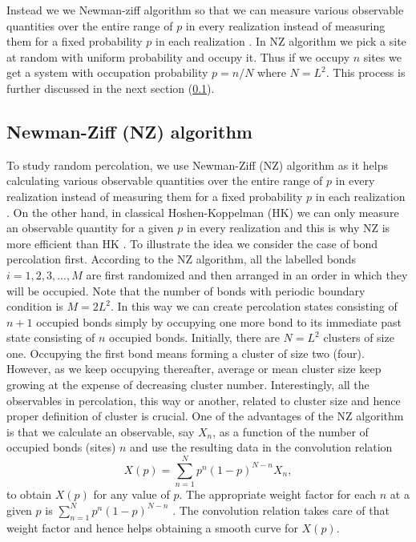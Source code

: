 		Instead we we Newman-ziff algorithm so that we can measure various observable quantities over the entire range of $p$ in every 
		realization instead of measuring them for a fixed probability $p$ in each realization \cite{Newman2001}. In NZ algorithm we pick a site at random with uniform probability and occupy it. Thus if we occupy $n$ sites we get a system with occupation probability $p=n/N$ where $N=L^2$. This process is further discussed in the next section (\ref{subsect.nz-algrithm}).
	
	\subsection{Newman-Ziff (NZ) algorithm}	
		\label{subsect.nz-algrithm}
		To study random percolation, we use Newman-Ziff (NZ) algorithm as 
		it helps calculating various observable quantities over the entire range of $p$ in every 
		realization instead of measuring them for a fixed probability $p$ in each realization \cite{Newman2001}.
		On the other hand, in classical Hoshen-Koppelman (HK) we can only measure an observable quantity
		for a given $p$ in every realization and this is why NZ is more efficient than HK \cite{Hoshen1976}.
		To illustrate the idea we consider the case of bond percolation first. 
		According to the NZ algorithm, all the labelled bonds $i=1,2,3,..., M$ 
		are first randomized and then arranged in an order 
		in which they will be occupied. Note that the number of bonds with periodic
		boundary condition is $M=2L^2$. In this way we 
		can create percolation states consisting of $n+1$ occupied bonds
		simply by occupying one more bond to its immediate past state consisting of $n$ occupied 
		bonds. Initially, there are $N=L^2$ clusters of size one.
		Occupying the first bond  means forming a cluster of size two (four). However, 
		as we keep occupying thereafter, average or mean cluster size keep growing 
		at the expense of decreasing cluster number. Interestingly, all the observables in percolation, this
		way or another, related to cluster size and hence proper definition of cluster is crucial.
		One of the advantages of the NZ algorithm is that we calculate an observable, say $X_n$, as 
		a function of the number of occupied bonds (sites) $n$ and use the resulting data in the convolution relation
		\begin{equation}
		\label{eq:convolution}
		X(p)=\sum_{n=1}^N p^n(1-p)^{N-n} X_n,
		\end{equation}
		to obtain $X(p)$ for any value of $p$. 
		The appropriate weight factor for each $n$ at a given $p$ is $\sum_{n=1}^N p^n(1-p)^{N-n}$ \cite{Newman2001}. 
		The convolution relation takes care of that weight factor and hence helps obtaining a smooth curve for $X(p)$.
		
